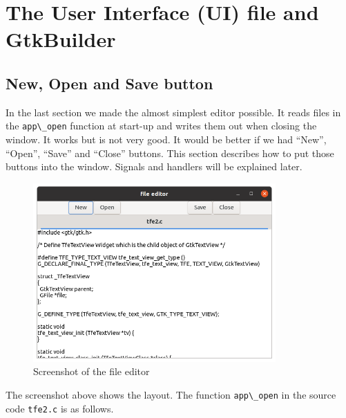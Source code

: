 \hypertarget{the-user-interface-ui-file-and-gtkbuilder}{%
\section{The User Interface (UI) file and
GtkBuilder}\label{the-user-interface-ui-file-and-gtkbuilder}}

\hypertarget{new-open-and-save-button}{%
\subsection{New, Open and Save button}\label{new-open-and-save-button}}

In the last section we made the almost simplest editor possible. It
reads files in the \passthrough{\lstinline!app\_open!} function at
start-up and writes them out when closing the window. It works but is
not very good. It would be better if we had ``New'', ``Open'', ``Save''
and ``Close'' buttons. This section describes how to put those buttons
into the window. Signals and handlers will be explained later.

\begin{figure}
\centering
\includegraphics[width=9.3cm,height=6.825cm]{../image/screenshot_tfe2.png}
\caption{Screenshot of the file editor}
\end{figure}

The screenshot above shows the layout. The function
\passthrough{\lstinline!app\_open!} in the source code
\passthrough{\lstinline!tfe2.c!} is as follows.

